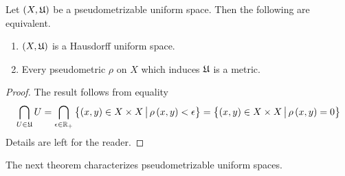 \begin{fact}\label{fact:Hausdorff_and_pseudometrizable_is_metrizable}
Let $(X,{\mathfrak U})$ be a pseudometrizable uniform space. Then the following are equivalent.
\begin{enumerate}[label=\emph{\textbf{(\roman*)}}, leftmargin=*]
\item $(X,{\mathfrak U})$ is a Hausdorff uniform space.
\item Every pseudometric $\rho$ on $X$ which induces ${\mathfrak U}$ is a metric.
\end{enumerate} 
\end{fact}
\begin{proof}
The result follows from equality
$$\bigcap_{U\in {\mathfrak U}}U =  \bigcap_{\epsilon \in {\mathbb R}_+}\big\{(x,y)\in X\times X\,\big|\,\rho\left(x,y\right) < \epsilon\big\} = \big\{(x,y)\in X\times X\,\big|\,\rho\left(x,y\right) = 0\big\}$$
Details are left for the reader.
\end{proof}
\noindent
The next theorem characterizes pseudometrizable uniform spaces.

